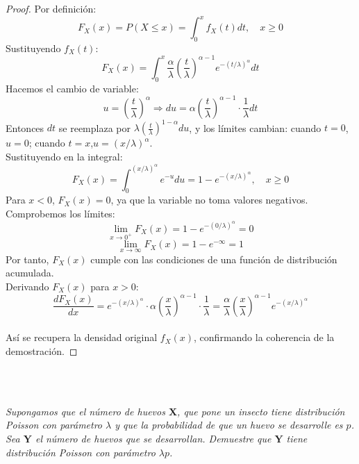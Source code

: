 \documentclass[11pt,letterpaper]{article}
\begin{document}
\begin{proof}
Por definición:
\[
F_X(x) = P(X \leq x) = \int_0^x f_X(t) dt, \quad x \geq 0
\]
Sustituyendo \( f_X(t) \):
\[
F_X(x) = \int_0^x \frac{\alpha}{\lambda} \left( \frac{t}{\lambda} \right)^{\alpha - 1} e^{-(t/\lambda)^\alpha} dt
\]
Hacemos el cambio de variable:
\[
u = \left( \frac{t}{\lambda} \right)^\alpha \Rightarrow du = \alpha \left( \frac{t}{\lambda} \right)^{\alpha - 1} \cdot \frac{1}{\lambda} dt
\]
Entonces \( dt \) se reemplaza por \( \lambda \left( \frac{t}{\lambda} \right)^{1 - \alpha} du \), y los límites cambian: cuando \( t = 0 \), \( u = 0 \); cuando \(t=x\),$u=(x/\lambda)^\alpha $.
\\
Sustituyendo en la integral:
\[
F_X(x) = \int_0^{(x/\lambda)^\alpha} e^{-u} du = 1 - e^{-(x/\lambda)^\alpha}, \quad x \geq 0
\]
Para \( x < 0 \), \( F_X(x) = 0 \), ya que la variable no toma valores negativos.
Comprobemos los límites:
\[
\lim_{x \to 0^+} F_X(x) = 1 - e^{-(0/\lambda)^\alpha} = 0
\]
\[
\lim_{x \to \infty} F_X(x) = 1 - e^{-\infty} = 1
\]
Por tanto, \( F_X(x) \) cumple con las condiciones de una función de distribución acumulada.\\
Derivando \( F_X(x) \) para \( x > 0 \):\,\\
\[
\frac{dF_X(x)}{dx} = e^{-(x/\lambda)^\alpha} \cdot \alpha \left( \frac{x}{\lambda} \right)^{\alpha - 1} \cdot \frac{1}{\lambda} = \frac{\alpha}{\lambda} \left( \frac{x}{\lambda} \right)^{\alpha - 1} e^{-(x/\lambda)^\alpha}
\]
\\
Así se recupera la densidad original \( f_X(x) \), confirmando la coherencia de la demostración.
\end{proof}\,\\
\,\\
\begin{tcolorbox}[
	title = \textcolor{black}{\textcolor{white}{Problema 6}},]
\textit{Supongamos que el n\'umero de huevos $\mathbf{X}$, que pone un insecto tiene distribuci\'on Poisson con par\'ametro $ \lambda$ y que la probabilidad de que un huevo se desarrolle es $p$. Sea $\mathbf{Y}$ el n\'umero de huevos que se desarrollan. Demuestre que $\mathbf{Y}$ tiene distribuci\'on Poisson con par\'ametro $\lambda p$.}
\end{tcolorbox}
\end{document}

